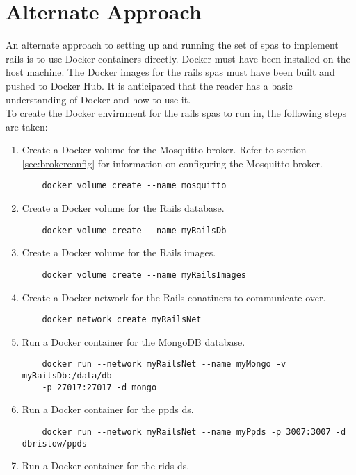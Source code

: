 \chapter{Alternate Approach} 
\label{ch:altsapproach}
An alternate approach to setting up and running the set of \glspl{spa} to implement \gls{rails} is to use Docker containers directly. Docker must have been installed on the host machine. The Docker images for the \gls{rails} \glspl{spa} must have been built and pushed to Docker Hub. It is anticipated that the reader has a basic understanding of Docker and how to use it.\\
To create the Docker envirnment for the \gls{rails} \glspl{spa} to run in, the following steps are taken:
\begin{enumerate}
    \item Create a Docker volume for the Mosquitto broker. Refer to section \ref{sec:brokerconfig} for information on configuring the Mosquitto broker.
    \begin{verbatim}
    docker volume create --name mosquitto
    \end{verbatim}
    \item Create a Docker volume for the Rails database.
    \begin{verbatim}
    docker volume create --name myRailsDb  
    \end{verbatim}
    \item Create a Docker volume for the Rails images.
    \begin{verbatim}
    docker volume create --name myRailsImages
    \end{verbatim}
    \item Create a Docker network for the Rails conatiners to communicate over.
    \begin{verbatim}
    docker network create myRailsNet
    \end{verbatim}
    \item Run a Docker container for the MongoDB database.
    \begin{verbatim}
    docker run --network myRailsNet --name myMongo -v myRailsDb:/data/db
    -p 27017:27017 -d mongo
    \end{verbatim}
    \item Run a Docker container for the \gls{ppds} \gls{ds}.
    \begin{verbatim}
    docker run --network myRailsNet --name myPpds -p 3007:3007 -d dbristow/ppds
    \end{verbatim}
    \item Run a Docker container for the \gls{rids} \gls{ds}.

\end{enumerate}
